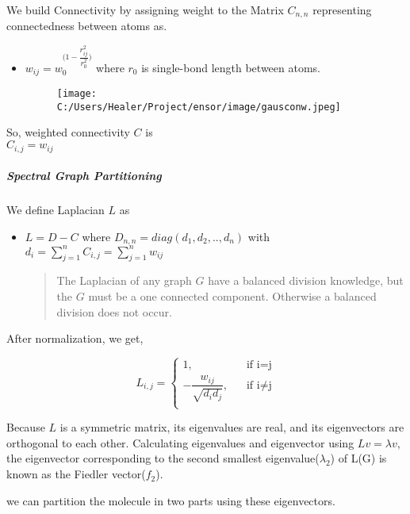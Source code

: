 \documentclass[
]{article}
\begin{document}
We build Connectivity by assigning weight to the Matrix \(C_{n,n}\)
representing connectedness between atoms as.

\begin{itemize}
\item
  \(w_{ij}=w_{0}^{\bigg(1-\dfrac{r_{ij}^2}{r^2_0}\bigg)}\) where \(r_0\)
  is single-bond length between atoms.

  \begin{figure}
  \centering
  \texttt{[image: C:/Users/Healer/Project/ensor/image/gausconw.jpeg]}
  \caption{}
  \end{figure}
\end{itemize}

So, weighted connectivity \(C\) is \\
\(C_{i,j}=w_{ij}\)

\hypertarget{header-n1611}{%
\subparagraph{Spectral Graph Partitioning}\label{header-n1611}}

We define Laplacian \(L\) as

\begin{itemize}
\item
  \(L=D-C\) where \(D_{n,n}=diag(d_1,d_2,..,d_n)\) with
  \(d_i=\sum_{j=1}^{n} C_{i,j}=\sum_{j=1}^{n} w_{ij}\)

  \begin{quote}
  The Laplacian of any graph \(G\) have a balanced division knowledge,
  but the \(G\) must be a one connected component. Otherwise a balanced
  division does not occur.
  \end{quote}
\end{itemize}

After normalization, we get,

\begin{equation}
L_{i,j}=\begin{cases}
       \text{1,} &\quad\text{if i=j}\\
       -\dfrac{w_{ij}}{\sqrt{d_id_j}}\text{,} &\quad\text{if i$\neq$j}\\
     \end{cases}
\end{equation}

Because \(L\) is a symmetric matrix, its eigenvalues are real, and its
eigenvectors are orthogonal to each other. Calculating eigenvalues and
eigenvector using \(Lv={\lambda} v\), the eigenvector corresponding to
the second smallest eigenvalue(\(\lambda_{2}\)) of L(G) is known as the
Fiedler vector(\(f_{2}\)).

we can partition the molecule in two parts using these eigenvectors.
\end{document}
